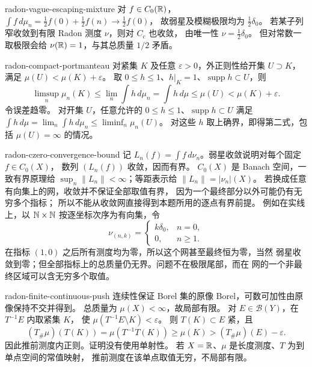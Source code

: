 \begin{solution}{radon-vague-escaping-mixture}
对 \(f\in C_0(\mathbb{R})\)，
\(\int f\,d\mu_n=\tfrac12f(0)+\tfrac12f(n)\to\tfrac12f(0)\)，
故弱星及模糊极限均为 \(\tfrac12\delta_0\)。
若某子列窄收敛到有限 Radon 测度 \(\nu\)，则对 \(C_c\) 也收敛，
由唯一性 \(\nu=\tfrac12\delta_0\)。
但对常数一取极限会给 \(\nu(\mathbb{R})=1\)，与其总质量 \(1/2\) 矛盾。
\end{solution}

\begin{solution}{radon-compact-portmanteau}
对紧集 \(K\) 及任意 \(\varepsilon>0\)，外正则性给开集
\(U\supset K\)，满足 \(\mu(U)<\mu(K)+\varepsilon\)。
取 \(0\le h\le1\)、\(h|_K=1\)、\(\operatorname{supp}h\subset U\)，则
\[
 \limsup_n\mu_n(K)
 \le\lim_n\int h\,d\mu_n
 =\int h\,d\mu\le\mu(U)<\mu(K)+\varepsilon.
\]
令误差趋零。
对开集 \(U\)，任意允许的 \(0\le h\le1\)、\(\operatorname{supp}h\subset U\)
满足
\(\int h\,d\mu=\lim_n\int h\,d\mu_n\le\liminf_n\mu_n(U)\)。
对这些 \(h\) 取上确界，即得第二式，包括 \(\mu(U)=\infty\) 的情况。
\end{solution}

\begin{solution}{radon-czero-convergence-bound}
记 \(L_n(f)=\int f\,d\nu_n\)。弱星收敛说明对每个固定 \(f\in C_0(X)\)，
数列 \((L_n(f))\) 收敛，因而有界。
\(C_0(X)\) 是 Banach 空间，一致有界原理给
\(\sup_n\|L_n\|<\infty\)；等距表示给
\(\|L_n\|=|\nu_n|(X)\)。
若换成任意有向集上的网，收敛并不保证全部取值有界，
因为一个最终部分以外可能仍有无穷多个指标；
所以不能从收敛网直接得到本题所用的逐点有界前提。
例如在实线上，以 \(\mathbb{N}\times\mathbb{N}\) 按逐坐标次序为有向集，令
\[
 \nu_{(n,k)}=
 \begin{cases}k\delta_0,&n=0,\\0,&n\ge1.\end{cases}
\]
在指标 \((1,0)\) 之后所有测度均为零，所以这个网甚至最终恒为零，当然
弱星收敛到零；但全部指标上的总质量仍无界。问题不在极限尾部，而在
网的一个非最终区域可以含无穷多个取值。
\end{solution}

\begin{solution}{radon-finite-continuous-push}
连续性保证 Borel 集的原像 Borel，可数可加性由原像保持不交并得到。
总质量为 \(\mu(X)<\infty\)，故局部有限。
对 \(E\in\mathcal B(Y)\)，在 \(T^{-1}E\) 内取紧集 \(K\)，
使 \(\mu(T^{-1}E\setminus K)<\varepsilon\)。
则 \(T(K)\subset E\) 紧，且
\[
 (T_\#\mu)(T(K))
 =\mu(T^{-1}T(K))\ge\mu(K)>
 (T_\#\mu)(E)-\varepsilon.
\]
因此推前测度内正则。证明没有使用单射性。
若 \(X=\mathbb{R}\)、\(\mu\) 是长度测度、\(T\) 为到单点空间的常值映射，
推前测度在该单点取值无穷，不局部有限。
\end{solution}

